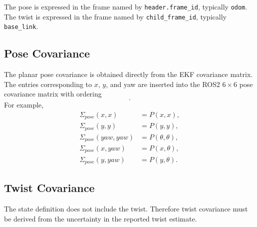 \documentclass[11pt]{article}
\begin{document}
The pose is expressed in the frame named by \texttt{header.frame\_id},
typically \texttt{odom}. The twist is expressed in the frame named by
\texttt{child\_frame\_id}, typically \texttt{base\_link}.

\subsection{Pose Covariance}

The planar pose covariance is obtained directly from the EKF covariance
matrix. The entries corresponding to $x$, $y$, and yaw are inserted into
the ROS2 $6\times 6$ pose covariance matrix with ordering
\begin{equation}
[x,\ y,\ z,\ roll,\ pitch,\ yaw].
\end{equation}
For example,
\begin{align}
\Sigma_{pose}(x,x) &= P(x,x), \\
\Sigma_{pose}(y,y) &= P(y,y), \\
\Sigma_{pose}(yaw,yaw) &= P(\theta,\theta), \\
\Sigma_{pose}(x,yaw) &= P(x,\theta), \\
\Sigma_{pose}(y,yaw) &= P(y,\theta).
\end{align}

\subsection{Twist Covariance}

The state definition does not include the twist. Therefore twist covariance must be derived from the uncertainty in the reported twist estimate.
\end{document}
